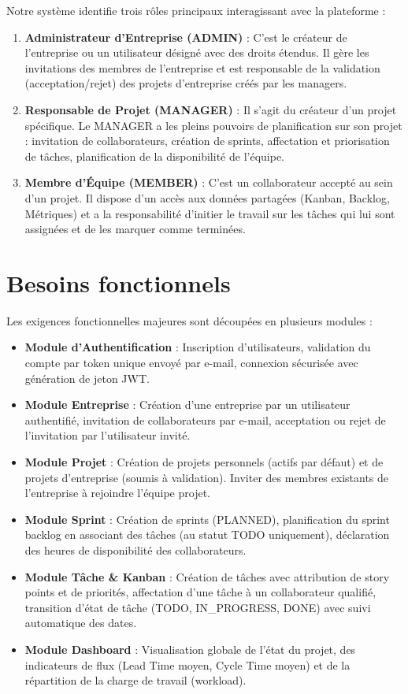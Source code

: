 \documentclass[12pt,a4paper]{report}
\begin{document}
Notre système identifie trois rôles principaux interagissant avec la plateforme :
\begin{enumerate}
\item \textbf{Administrateur d'Entreprise (ADMIN)} : C'est le créateur de l'entreprise ou un utilisateur désigné avec des droits étendus. Il gère les invitations des membres de l'entreprise et est responsable de la validation (acceptation/rejet) des projets d'entreprise créés par les managers.
\item \textbf{Responsable de Projet (MANAGER)} : Il s'agit du créateur d'un projet spécifique. Le MANAGER a les pleins pouvoirs de planification sur son projet : invitation de collaborateurs, création de sprints, affectation et priorisation de tâches, planification de la disponibilité de l'équipe.
\item \textbf{Membre d'Équipe (MEMBER)} : C'est un collaborateur accepté au sein d'un projet. Il dispose d'un accès aux données partagées (Kanban, Backlog, Métriques) et a la responsabilité d'initier le travail sur les tâches qui lui sont assignées et de les marquer comme terminées.
\end{enumerate}

\section{Besoins fonctionnels}

Les exigences fonctionnelles majeures sont découpées en plusieurs modules :
\begin{itemize}
\item \textbf{Module d'Authentification} : Inscription d'utilisateurs, validation du compte par token unique envoyé par e-mail, connexion sécurisée avec génération de jeton JWT.
\item \textbf{Module Entreprise} : Création d'une entreprise par un utilisateur authentifié, invitation de collaborateurs par e-mail, acceptation ou rejet de l'invitation par l'utilisateur invité.
\item \textbf{Module Projet} : Création de projets personnels (actifs par défaut) et de projets d'entreprise (soumis à validation). Inviter des membres existants de l'entreprise à rejoindre l'équipe projet.
\item \textbf{Module Sprint} : Création de sprints (PLANNED), planification du sprint backlog en associant des tâches (au statut TODO uniquement), déclaration des heures de disponibilité des collaborateurs.
\item \textbf{Module Tâche \& Kanban} : Création de tâches avec attribution de story points et de priorités, affectation d'une tâche à un collaborateur qualifié, transition d'état de tâche (TODO, IN\_PROGRESS, DONE) avec suivi automatique des dates.
\item \textbf{Module Dashboard} : Visualisation globale de l'état du projet, des indicateurs de flux (Lead Time moyen, Cycle Time moyen) et de la répartition de la charge de travail (workload).
\end{itemize}
\end{document}
